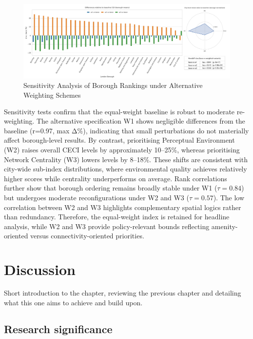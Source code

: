 \documentclass[
  12pt,
  oneside]{book}
\begin{document}
\begin{figure}

{\centering \includegraphics[width=1\linewidth]{general_images/cqi_robustness_delta_bar} 

}

\caption{Sensitivity Analysis of Borough Rankings under Alternative Weighting Schemes}\label{fig:cqirobustnessdeltabar}
\end{figure}

Sensitivity tests confirm that the equal-weight baseline is robust to moderate re-weighting. The alternative specification W1 shows negligible differences from the baseline (r=0.97, max \textbar Δ\%), indicating that small perturbations do not materially affect borough-level results. By contrast, prioritising Perceptual Environment (W2) raises overall CECI levels by approximately 10--25\%, whereas prioritising Network Centrality (W3) lowers levels by 8--18\%. These shifts are consistent with city-wide sub-index distributions, where environmental quality achieves relatively higher scores while centrality underperforms on average. Rank correlations further show that borough ordering remains broadly stable under W1 (\(\tau = 0.84\)) but undergoes moderate reconfigurations under W2 and W3 (\(\tau = 0.57\)). The low correlation between W2 and W3 highlights complementary spatial logics rather than redundancy. Therefore, the equal-weight index is retained for headline analysis, while W2 and W3 provide policy-relevant bounds reflecting amenity-oriented versus connectivity-oriented priorities.

\chapter{Discussion}\label{discussion}

Short introduction to the chapter, reviewing the previous chapter and detailing what this one aims to achieve and build upon.

\section{Research significance}\label{research-significance}
\end{document}
